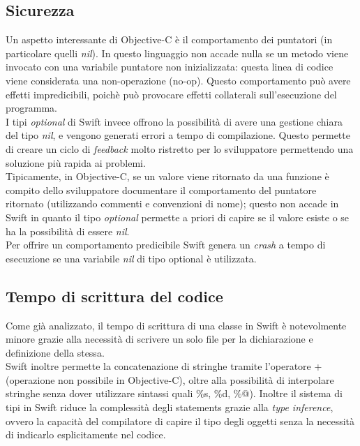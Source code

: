\subsection{Sicurezza} 
Un aspetto interessante di Objective-C è il comportamento dei puntatori (in particolare quelli \textit{nil}). In questo linguaggio non accade nulla se un metodo viene invocato con una variabile puntatore non inizializzata: questa linea di codice viene considerata una non-operazione (no-op). Questo comportamento può avere effetti impredicibili, poichè può provocare effetti collaterali sull'esecuzione del programma.\\
I tipi \textit{optional} di Swift invece offrono la possibilità di avere una gestione chiara del tipo \textit{nil}, e vengono generati errori a tempo di compilazione. Questo permette di creare un ciclo di \textit{feedback} molto ristretto per lo sviluppatore permettendo una soluzione più rapida ai problemi.\\
Tipicamente, in Objective-C, se un valore viene ritornato da una funzione è compito dello sviluppatore documentare il comportamento del puntatore ritornato (utilizzando commenti e convenzioni di nome); questo non accade in Swift in quanto il tipo \textit{optional} permette a priori di capire se il valore esiste o se ha la possibilità di essere \textit{nil}.\\ Per offrire un comportamento predicibile Swift genera un \textit{crash} a tempo di esecuzione se una variabile \textit{nil} di tipo optional è utilizzata.\\
\subsection{Tempo di scrittura del codice}
Come già analizzato, il tempo di scrittura di una classe in Swift è notevolmente minore grazie alla necessità di scrivere un solo file per la dichiarazione e definizione della stessa.\\Swift inoltre permette la concatenazione di stringhe tramite l'operatore + (operazione non possibile in Objective-C), oltre alla possibilità di interpolare stringhe senza dover utilizzare sintassi quali \%s, \%d, \%@). Inoltre il sistema di tipi in Swift riduce la complessità degli statements grazie alla \textit{type inference}, ovvero la capacità del compilatore di capire il tipo degli oggetti senza la necessità di indicarlo esplicitamente nel codice.
